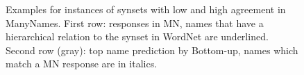 \begin{figure}[t]
\begin{minipage}[b]{0.5\linewidth}
{\begin{tabular}{p{2.6cm}|p{2.6cm}|p{2.6cm}|p{2.6cm}|p{2.6cm}|p{2.6cm}}
			\end{tabular}
		}
	\end{minipage}
	\caption{Examples for instances of \vgenome synsets with low and high agreement in ManyNames. 
		First row: responses in MN, names that have a hierarchical relation to the \vgenome synset in WordNet are underlined.
	Second row (gray): top name prediction by Bottom-up, names which match a MN response are in italics.}
	\label{fig:ex-high-low-agreement}
\end{figure}


